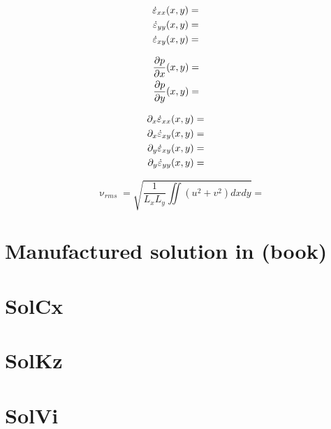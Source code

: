 \begin{eqnarray}
\dot\varepsilon_{xx}(x,y) &=&  \nonumber\\
\dot\varepsilon_{yy}(x,y) &=&  \nonumber\\
\dot\varepsilon_{xy}(x,y) &=&  \nonumber
\end{eqnarray}

\begin{eqnarray}
\frac{\partial p}{\partial x} (x,y)&=& \nonumber\\
\frac{\partial p}{\partial y} (x,y)&=& \nonumber
\end{eqnarray}

\begin{eqnarray}
\partial_x \dot\varepsilon_{xx} (x,y)&=& \nonumber\\
\partial_x \dot\varepsilon_{xy} (x,y)&=& \nonumber\\
\partial_y \dot\varepsilon_{xy} (x,y)&=& \nonumber\\
\partial_y \dot\varepsilon_{yy} (x,y)&=& \nonumber
\end{eqnarray}

\[
\upnu_{rms}=\sqrt{ \frac{1}{L_xL_y} \iint (u^2+v^2) dxdy   } = 
\]

\section{Manufactured solution in \textcite{dohu03} (book) \label{mms1}}


\section{SolCx}\label{ss:solcx} 


\section{SolKz} \label{ss:solkz} 


\section{SolVi} \label{ss:solvi} 


